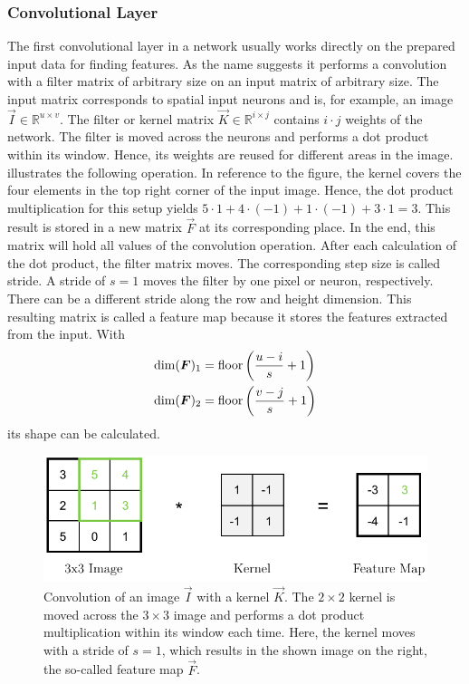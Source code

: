 \subsubsection{Convolutional Layer}
\label{sec:cnn-convolutional-layer}
The first convolutional layer in a network usually works directly on the prepared input data for finding features.
As the name suggests it performs a convolution with a filter matrix of arbitrary size on an input matrix of arbitrary size.
The input matrix corresponds to spatial input neurons and is, for example, an image $\vec{I} \in \mathbb{R}^{u \times v}$.
The filter or kernel matrix $\vec{K} \in \mathbb{R}^{i \times j}$ contains $i \cdot j$ weights of the network.
The filter is moved across the neurons and performs a dot product within its window.
Hence, its weights are reused for different areas in the image.
 illustrates the following operation.
In reference to the figure, the kernel covers the four elements in the top right corner of the input image.
Hence, the dot product multiplication for this setup yields $5 \cdot 1+4 \cdot (-1)+1 \cdot (-1)+3 \cdot 1=3$.
This result is stored in a new matrix $\vec{F}$ at its corresponding place.
In the end, this matrix will hold all values of the convolution operation.
After each calculation of the dot product, the filter matrix moves.
The corresponding step size is called stride.
A stride of $s=1$ moves the filter by one pixel or neuron, respectively.
There can be a different stride along the row and height dimension.
This resulting matrix is called a feature map because it stores the features extracted from the input.
With
\begin{subequations}
	\label{eq:feature-map-shape}
	\begin{align}
		\dim(\bm{F})_1 &= \operatorname{floor} \left( \frac{u - i}{s}+1 \right) \\
		\dim(\bm{F})_2 &= \operatorname{floor} \left( \frac{v - j}{s}+1 \right)
	\end{align}
\end{subequations}
its shape can be calculated.
\begin{figure}
	\centering
	\includegraphics{images/convolution.pdf}
	\caption[Convolution of an image with a kernel]{Convolution of an image $\vec{I}$ with a kernel $\vec{K}$. The $2 \times 2$ kernel is moved across the $3 \times 3$ image and performs a dot product multiplication within its window each time. Here, the kernel moves with a stride of $s=1$, which results in the shown image on the right, the so-called feature map $\vec{F}$.}
	\label{fig:convolution}
\end{figure}
